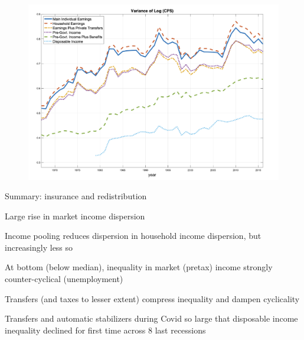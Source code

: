 \documentclass[11pt, aspectratio=169]{beamer}
\newenvironment{witemize}{\itemize\addtolength{\itemsep}{10pt}}{\enditemize}
\begin{document}
\begin{frame}{}
	\begin{figure}
		\includegraphics[scale=0.38]{./figures/inequality_government_4}
	\end{figure}
\end{frame}


\begin{frame}{Summary: insurance and redistribution}
\begin{witemize}
\item Large rise in market income dispersion 

\item Income pooling reduces dispersion in household income dispersion, but increasingly less so

\item At bottom (below median), inequality in market (pretax) income strongly counter-cyclical (unemployment)

\item Transfers (and taxes to lesser extent) compress inequality and dampen cyclicality

\item Transfers and automatic stabilizers during Covid so large that disposable income inequality declined for first time across 8 last recessions

\end{witemize}
\end{frame}
\end{document}
